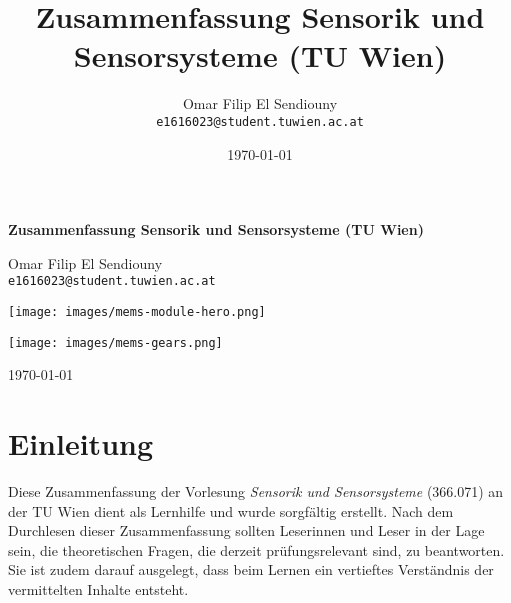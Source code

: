 \documentclass{article} %
\title{Zusammenfassung Sensorik und Sensorsysteme (TU Wien)}
\author{Omar Filip El Sendiouny \\ \texttt{e1616023@student.tuwien.ac.at}}
\date{\today}
\begin{document}
\begin{titlepage}
    \centering
    \vspace{2cm}
    {\Huge \bfseries Zusammenfassung Sensorik und Sensorsysteme (TU Wien) \par}
    
    \vspace{1cm}
    {\Large Omar Filip El Sendiouny \\ \texttt{e1616023@student.tuwien.ac.at} \par}

    \vspace*{2cm}

    \texttt{[image: images/mems-module-hero.png]}
    
    \texttt{[image: images/mems-gears.png]} 

    \vspace*{2cm} 
    
    \vfill
    
    {\large \today \par}
\end{titlepage}

\tableofcontents
\thispagestyle{empty}
\listoftables
\thispagestyle{empty}
\listoffigures
\thispagestyle{empty}
\newpage






\section*{Einleitung}

Diese Zusammenfassung der Vorlesung \textit{Sensorik und Sensorsysteme} (366.071) an der TU Wien dient als Lernhilfe und wurde sorgfältig erstellt. Nach dem Durchlesen dieser Zusammenfassung sollten Leserinnen und Leser in der Lage sein, die theoretischen Fragen, die derzeit prüfungsrelevant sind, zu beantworten. Sie ist zudem darauf ausgelegt, dass beim Lernen ein vertieftes Verständnis der vermittelten Inhalte entsteht. 

\vspace{1em}
\end{document}
